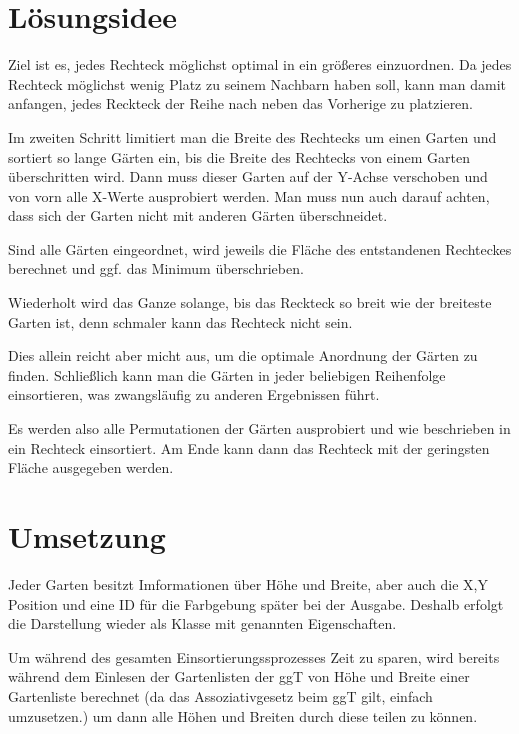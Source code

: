 \documentclass[a4paper,10pt,ngerman]{scrartcl}
\title{\Aufgabe}
\author{\Name\\Team-ID: \TeamId}
\date{\today}
\begin{document}
\maketitle
\tableofcontents

\section{Lösungsidee}
Ziel ist es, jedes Rechteck möglichst optimal in ein größeres einzuordnen. Da jedes Rechteck möglichst wenig Platz zu seinem Nachbarn haben soll, kann man damit anfangen, jedes Reckteck der Reihe nach neben das Vorherige zu platzieren.

Im zweiten Schritt limitiert man die Breite des Rechtecks um einen Garten und sortiert so lange Gärten ein, bis die Breite des Rechtecks von einem Garten überschritten wird. Dann muss dieser Garten auf der Y-Achse verschoben und von vorn alle X-Werte ausprobiert werden. Man muss nun auch darauf achten, dass sich der Garten nicht mit anderen Gärten überschneidet.

Sind alle Gärten eingeordnet, wird jeweils die Fläche des entstandenen Rechteckes berechnet und ggf. das Minimum überschrieben.

Wiederholt wird das Ganze solange, bis das Reckteck so breit wie der breiteste Garten ist, denn schmaler kann das Rechteck nicht sein.

Dies allein reicht aber micht aus, um die optimale Anordnung der Gärten zu finden. Schließlich kann man die Gärten in jeder beliebigen Reihenfolge einsortieren, was zwangsläufig zu anderen Ergebnissen führt.

Es werden also alle Permutationen der Gärten ausprobiert und wie beschrieben in ein Rechteck einsortiert. Am Ende kann dann das Rechteck mit der geringsten Fläche ausgegeben werden.

\section{Umsetzung}
Jeder Garten besitzt Imformationen über Höhe und Breite, aber auch die X,Y Position und eine ID für die Farbgebung später bei der Ausgabe. Deshalb erfolgt die Darstellung wieder als Klasse mit genannten Eigenschaften.

Um während des gesamten Einsortierungssprozesses Zeit zu sparen, wird bereits während dem Einlesen der Gartenlisten der ggT von Höhe und Breite einer Gartenliste berechnet (da das Assoziativgesetz beim ggT gilt, einfach umzusetzen.) um dann alle Höhen und Breiten durch diese teilen zu können.
\end{document}
